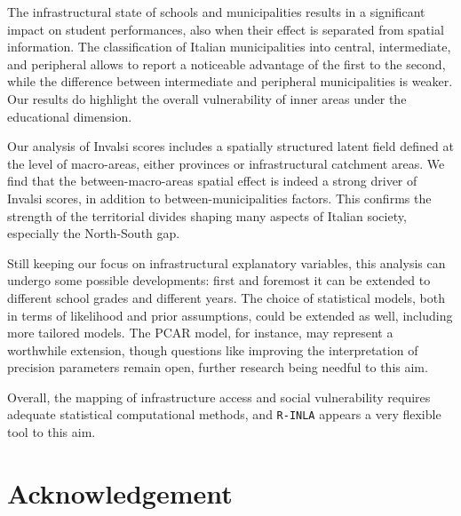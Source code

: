\documentclass{book}
\begin{document}
The infrastructural state of schools and municipalities results in a significant impact on student performances, also when their effect is separated from spatial information. The classification of Italian municipalities into central, intermediate, and peripheral allows to report a noticeable advantage of the first to the second, while the difference between intermediate and peripheral municipalities is weaker. Our results do highlight the overall vulnerability of inner areas under the educational dimension.

Our analysis of Invalsi scores includes a spatially structured latent field defined at the level of macro-areas, either provinces or infrastructural catchment areas. We find that the between-macro-areas spatial effect is indeed a strong driver of Invalsi scores, in addition to between-municipalities factors. This confirms the strength of the territorial divides shaping many aspects of Italian society, especially the North-South gap.

Still keeping our focus on infrastructural explanatory variables, this analysis can undergo some possible developments: first and foremost it can be extended to different school grades and different years. The choice of statistical models, both in terms of likelihood and prior assumptions, could be extended as well, including more tailored models. The PCAR model, for instance, may represent a worthwhile extension, though questions like improving the interpretation of precision parameters remain open, further research being needful to this aim.

Overall, the mapping of infrastructure access and social vulnerability requires adequate statistical computational methods, and \texttt{R-INLA} appears a very flexible tool to this aim.









\section*{Acknowledgement}
\end{document}
